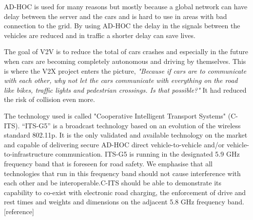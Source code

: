 AD-HOC is used for many reasons but mostly because a global network can have delay between the server and the cars and is hard to use in areas with bad connection to the grid. By using AD-HOC the delay in the signals between the vehicles are reduced and in traffic a shorter delay can save lives.
\bigskip

The goal of V2V is to reduce the total of cars crashes and especially in the future when cars are becoming completely autonomous and driving by themselves. This is where the V2X project enters the picture, \textit{"Because if cars are to communicate with each other, why not let the cars communicate with everything on the road like bikes, traffic lights and pedestrian crossings. Is that possible?"} It had reduced the risk of collision even more.
\bigskip

The technology used is called "Cooperative Intelligent Transport Systems" (C-ITS).  “ITS-G5” is a broadcast technology based on an evolution of the wireless standard 802.11p. It is the only validated and available technology on the market and capable of delivering secure AD-HOC direct vehicle-to-vehicle and/or vehicle-to-infrastructure communication. ITS-G5 is running in the designated 5.9 GHz frequency band that is foreseen for road safety. We emphasise that all technologies that run in this frequency band should not cause interference with each other and be interoperable.C-ITS should be able to demonstrate its capability to co-exist with electronic road charging, the enforcement of drive and rest times and weights and dimensions on the adjacent 5.8 GHz frequency band. [reference]
